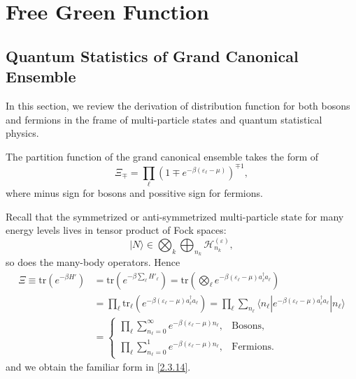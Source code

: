 \documentclass[b5paper,10pt,UTF8]{book}
\numberwithin{equation}{section}
\begin{document}
	\section{Free Green Function}
		\subsection{Quantum Statistics of Grand Canonical Ensemble}
		In this section, we review the derivation of distribution function for both bosons and fermions in the frame of multi-particle states and quantum statistical physics.
		\begin{Lemma}
			The partition function of the grand canonical ensemble takes the form of
			\begin{equation}\label{2.3.14}
				\varXi_{\mp}=\prod_\ell(1\mp e^{-\beta(\varepsilon_\ell-\mu)})^{\mp1},
			\end{equation}
			where minus sign for bosons and possitive sign for fermions.
		\end{Lemma}
		\begin{Proof}
		Recall that the symmetrized or anti-symmetrized multi-particle state for many energy levels lives in tensor product of Fock spaces:
		$$|N\rangle\in\bigotimes_{k}\bigoplus_{n_k}\mathcal{H}_{n_k}^{(\varepsilon)},$$
		so does the many-body operators. Hence
		\begin{align*}
			\varXi\equiv\mathrm{tr}(e^{-\beta H'})&=\mathrm{tr}\left(e^{-\beta \sum_\ell H'_\ell}\right)=\mathrm{tr}\left(\bigotimes_{\ell}e^{-\beta(\varepsilon_\ell-\mu)a_\ell^\dagger a_\ell}\right)\\
			&=\prod_{\ell}\mathrm{tr}_\ell\left(e^{-\beta(\varepsilon_\ell-\mu)a_\ell^\dagger a_\ell}\right)=\prod_\ell\sum_{n_\ell}\langle n_\ell|e^{-\beta(\varepsilon_\ell-\mu)a_\ell^\dagger a_\ell}|n_\ell\rangle\\
			&=\begin{cases}\displaystyle\prod_{\ell}\sum_{n_\ell=0}^\infty e^{-\beta(\varepsilon_\ell-\mu)n_\ell},&\text{Bosons},\\\displaystyle\prod_{\ell}\sum_{n_\ell=0}^1 e^{-\beta(\varepsilon_\ell-\mu)n_\ell},&\text{Fermions}.\end{cases}
		\end{align*}
		and we obtain the familiar form in \eqref{2.3.14}.
		\end{Proof}
		
\end{document}
